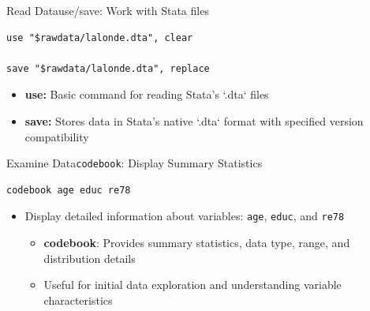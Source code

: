 \documentclass[hyperref={pdfpagelabels=false}]{beamer}
\begin{document}
\begin{frame}[fragile]{Read Data}{use/save: Work with Stata files}
\begin{lstlisting}
use "$rawdata/lalonde.dta", clear

save "$rawdata/lalonde.dta", replace
\end{lstlisting}
	
	\begin{itemize}
		\vspace{0.2cm}
		\item \textbf{use:} Basic command for reading Stata's `.dta` files
		\vspace{0.2cm}
		\item \textbf{save:} Stores data in Stata's native `.dta` format with specified version compatibility
		\vspace{0.2cm}
	\end{itemize}
\end{frame}



\begin{frame}[fragile]{Examine Data}{\texttt{codebook}: Display Summary Statistics}
\begin{lstlisting}
codebook age educ re78
\end{lstlisting}
\begin{itemize}
	\vspace{0.2cm}
	\item Display detailed information about variables: \texttt{age}, \texttt{educ}, and \texttt{re78}
	\vspace{0.2cm}
	\begin{itemize}
		\item \textbf{codebook}: Provides summary statistics, data type, range, and distribution details
		\vspace{0.2cm}
		\item Useful for initial data exploration and understanding variable characteristics
	\end{itemize}
\end{itemize}
\end{frame}
\end{document}
